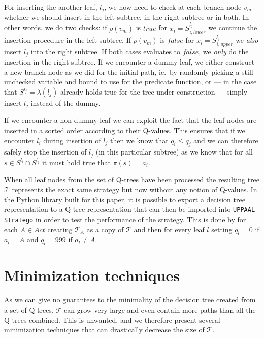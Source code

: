 For inserting the another leaf, $l_j$, we now need to check at each branch node
$v_m$ whether we should insert in the left subtree, in the right subtree or in
both.  In other words, we do two checks: if $\rho(v_m)$ is $true$ for $x_i =
S^{l_j}_{i,lower}$ we continue the insertion procedure in the left subtree.  If
$\rho(v_m)$ is $false$ for $x_i = S^{l_j}_{i, upper}$ we \textit{also} insert
$l_j$ into the right subtree. If both cases evaluates to $false$, we
\textit{only} do the insertion in the right subtree. If we encounter a dummy
leaf, we either construct a new branch node as we did for the initial path, ie.\ by
randomly picking a still unchecked variable and bound to use for the predicate
function, or --- in the case that $S^{l_j} = \lambda(l_j)$ already holds true
for the tree under construction --- simply insert $l_j$ instead of the dummy.

If we encounter a non-dummy leaf we can exploit the fact that the leaf nodes are
inserted in a sorted order according to their Q-values. This ensures that if we
encounter $l_i$ during insertion of $l_j$ then we know that $q_i \le  q_j$ and
we can therefore safely stop the insertion of $l_j$ (in this particular subtree)
as we know that for all $s \in S^{l_i} \cap S^{l_j}$ it must hold true that
$\pi(s) = a_i$.

When all leaf nodes from the set of Q-trees have been processed the resulting
tree $\mathcal{T}$ represents the exact same strategy but now without any notion
of Q-values. In the Python library built for this paper, it is possible to
export a decision tree representation to a Q-tree representation that can then
be imported into \texttt{UPPAAL Stratego} in order to test the performance of
the strategy. This is done by for each $A \in Act$ creating
$\mathcal{T}_A$ as a copy of $\mathcal{T}$ and then for every leaf $l$ setting
$q_l = 0$ if $a_l = A$ and $q_l = 999$ if $a_l \neq A$.

\section{Minimization techniques}%
\label{sec:minimization}

As we can give no guarantees to the minimality of the decision tree created from
a set of Q-trees, $\mathcal{T}$ can grow very large and even contain more paths
than all the Q-trees combined. This is unwanted, and we therefore present
several minimization techniques that can drastically decrease the size of
$\mathcal{T}$.

